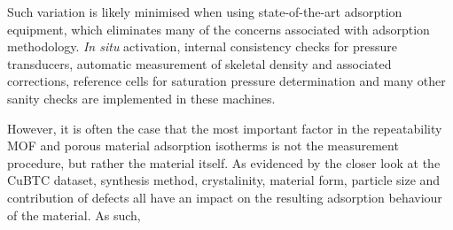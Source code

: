 Such variation is likely minimised when using state-of-the-art
adsorption equipment, which eliminates many of the concerns
associated with adsorption methodology. \textit{In situ}
activation, internal consistency checks for pressure transducers,
automatic measurement of skeletal density and associated
corrections, reference cells for saturation pressure determination
and many other sanity checks are implemented in these machines.

However, it is often the case that the most important factor
in the repeatability MOF and porous material adsorption isotherms
is not the measurement procedure, but rather the material itself.
As evidenced by the closer look at the CuBTC dataset, synthesis
method, crystalinity, material form, particle size and contribution
of defects all have an impact on the resulting adsorption behaviour
of the material. As such,